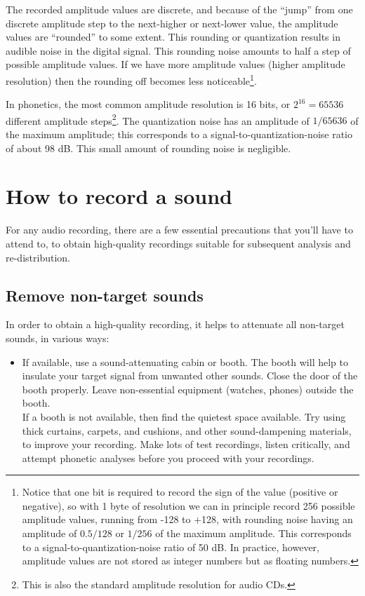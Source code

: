 \documentclass[
]{book}
\providecommand{\tightlist}{%
  \setlength{\itemsep}{0pt}\setlength{\parskip}{0pt}}
\begin{document}
The recorded amplitude values are discrete, and because of the ``jump'' from one discrete amplitude step to the next-higher or next-lower value, the amplitude values are ``rounded'' to some extent. This rounding or quantization results in audible noise in the digital signal. This rounding noise amounts to half a step of possible amplitude values. If we have more amplitude values (higher amplitude resolution) then the rounding off becomes less noticeable\footnote{Notice that one bit is required to record the sign of the value (positive or negative), so with 1 byte of resolution we can in principle record 256 possible amplitude values, running from -128 to +128, with rounding noise having an amplitude of \(0.5/128\) or \(1/256\) of the maximum amplitude. This corresponds to a signal-to-quantization-noise ratio of 50 dB. In practice, however, amplitude values are not stored as integer numbers but as floating numbers.}.

In phonetics, the most common amplitude resolution is 16 bits, or \(2^{16} = 65536\) different amplitude steps\footnote{This is also the standard amplitude resolution for audio CDs.}. The quantization noise has an amplitude of \(1/65636\) of the maximum amplitude; this corresponds to a signal-to-quantization-noise ratio of about 98 dB. This small amount of rounding noise is negligible.

\section{How to record a sound}\label{how-to-record-a-sound}

For any audio recording, there are a few essential precautions that you'll have to attend to, to obtain high-quality recordings suitable for subsequent analysis and re-distribution.

\label{recording}
\subsection{Remove non-target sounds}\label{sec:removenontargetsounds}

In order to obtain a high-quality recording, it helps to attenuate all non-target sounds, in various ways:

\begin{itemize}
\tightlist
\item
  If available, use a sound-attenuating cabin or booth. The booth will help to insulate your target signal from unwanted other sounds. Close the door of the booth properly. Leave non-essential equipment (watches, phones) outside the booth.\\
  If a booth is not available, then find the quietest space available. Try using thick curtains, carpets, and cushions, and other sound-dampening materials, to improve your recording. Make lots of test recordings, listen critically, and attempt phonetic analyses before you proceed with your recordings.
\end{itemize}
\end{document}
